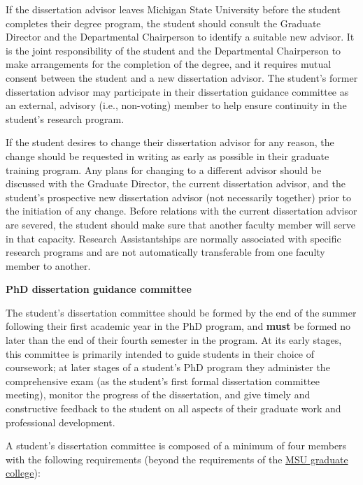 If the dissertation advisor leaves Michigan State University before the
student completes their degree program, the student should consult
the Graduate Director and the Departmental Chairperson to identify a
suitable new advisor.  It is the joint responsibility of the
student and the Departmental Chairperson to make arrangements for the
completion of the degree, and it requires mutual consent between the
student and a new dissertation advisor.  The student's former
dissertation advisor may participate in their dissertation guidance
committee as an external, advisory (i.e., non-voting) member to help
ensure continuity in the student's research program.

If the student desires to change their dissertation advisor for any
reason, the change should be requested in writing as early as possible in their
graduate training program.  Any plans for changing to a different
advisor should be discussed with the Graduate Director, 
 the current dissertation advisor, and the student's
prospective new dissertation advisor (not necessarily together) prior
to the initiation of any change.  Before relations with the current
dissertation advisor are severed, the student should make sure that
another faculty member will serve in that capacity.  Research
Assistantships are normally associated with specific research programs
and are not automatically transferable from one faculty member to
another.

\vspace{3mm}
\noindent
\textbf{PhD dissertation guidance committee}

The student's dissertation committee should be formed by the end of the
summer following their first academic year in the PhD program, and
\textbf{must} be formed no later than the end of their fourth semester
in the program. At its early stages, this committee is primarily
intended to guide students in their choice of coursework; at later
stages of a student's PhD program they administer the comprehensive
exam (as the student's first formal dissertation committee meeting), 
monitor the progress of the dissertation, and give timely and
constructive feedback to the student on all aspects of their graduate
work and professional development.

A student's dissertation committee is composed of a minimum of four
members with the following requirements (beyond the requirements of
the \href{https://hr.msu.edu/documents/facacadhandbooks/facultyhandbook/composition.htm}{MSU graduate
college}):

